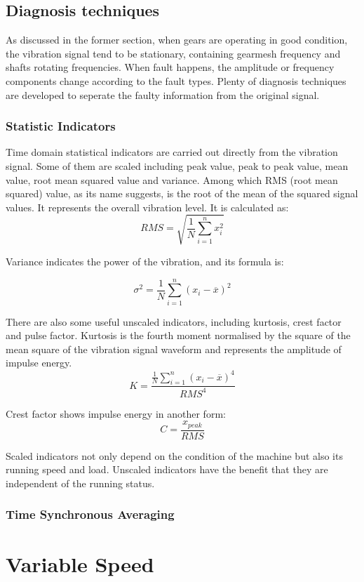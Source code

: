 \subsection{Diagnosis techniques}

As discussed in the former section, when gears are operating in good condition, the vibration signal tend to be stationary, containing gearmesh frequency and shafts rotating frequencies. When fault happens, the amplitude or frequency components change according to the fault types.
Plenty of diagnosis techniques are developed to seperate the faulty information from the original signal. \cite{practical}

\subsubsection{Statistic Indicators}

Time domain statistical indicators are carried out directly from the vibration signal. Some of them are scaled including peak value, peak to peak value, mean value, root mean squared value and variance.
Among which RMS (root mean squared) value, as its name suggests, is the root of the mean of the squared signal values. It represents the overall vibration level. It is calculated as:
\begin{equation}
	RMS = \sqrt{\frac{1}{N}\sum_{i=1}^n x_{i}^2}
\end{equation}

Variance indicates the power of the vibration, and its formula is:

\begin{equation}
	\sigma^2 = \frac{1}{N}\sum_{i=1}^n (x_{i} - \overline{x})^2
\end{equation}

There are also some useful unscaled indicators, including kurtosis, crest factor and pulse factor. Kurtosis is the fourth moment normalised by the square of the mean square of the vibration signal waveform and represents the amplitude of impulse energy. \cite{trending} 
\begin{equation}
	K = \frac{\frac{1}{N}\sum_{i=1}^n (x_{i} - \overline{x})^4}{RMS^4}
\end{equation}

Crest factor shows impulse energy in another form:
\begin{equation}
	C = \frac{x_{peak}}{RMS}
\end{equation}

Scaled indicators not only depend on the condition of the machine but also its running speed and load. Unscaled indicators have the benefit that they are independent of the running status.

\subsubsection{Time Synchronous Averaging}






\section{Variable Speed}















